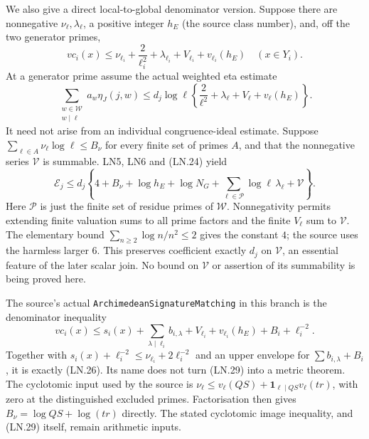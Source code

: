 We also give a direct local-to-global denominator version.  Suppose
there are nonnegative $\nu_\ell,\lambda_\ell$, a positive integer
$h_E$ (the source class number), and, off the two generator primes,
\[
 v\!c_i(x)\le\nu_{\ell_i}+\frac2{\ell_i^2}
                  +\lambda_{\ell_i}+V_{\ell_i}+v_{\ell_i}(h_E)
                       \quad(x\in Y_i).                \tag{LN.26}
\]
At a generator prime assume the actual weighted eta estimate
\[
 \sum_{\substack{w\in\mathcal W\\w\mid\ell}}a_w\eta_J(j,w)
 \le d_j\log\ell\left\{\frac2{\ell^2}+\lambda_\ell
                          +V_\ell+v_\ell(h_E)\right\}.
 \tag{LN.27}
\]
It need not arise from an individual congruence-ideal estimate.
Suppose $\sum_{\ell\in A}\nu_\ell\log\ell\le B_\nu$ for every
finite set of primes $A$, and that the nonnegative series
$\mathcal V$ is summable.  LN5, LN6 and (LN.24) yield
\[
 \boxed{\quad\mathcal E_j\le d_j\left\{
      4+B_\nu+\log h_E+\log N_G+
      \sum_{\ell\in\mathcal P}\log\ell\,\lambda_\ell
                       +\mathcal V\right\}.\quad}     \tag{LN.28}
\]
Here $\mathcal P$ is just the finite set of residue primes of
$\mathcal W$.  Nonnegativity permits extending finite valuation
sums to all prime factors and the finite $V_\ell$ sum to
$\mathcal V$.  The elementary bound
$\sum_{n\ge2}\log n/n^2\le2$ gives the constant $4$; the source
uses the harmless larger $6$.  This preserves coefficient exactly
$d_j$ on $\mathcal V$, an essential feature of the later scalar
join.  No bound on $\mathcal V$ or assertion of its summability is
being proved here.

The source's actual \texttt{ArchimedeanSignatureMatching} in this
branch is the denominator inequality
\[
 v\!c_i(x)\le s_i(x)+\sum_{\lambda\mid\ell_i}b_{i,\lambda}
                 +V_{\ell_i}+v_{\ell_i}(h_E)+B_i+\ell_i^{-2}.
 \tag{LN.29}
\]
Together with $s_i(x)+\ell_i^{-2}\le\nu_{\ell_i}+2\ell_i^{-2}$
and an upper envelope for $\sum b_{i,\lambda}+B_i$, it is exactly
(LN.26).  Its name does not turn (LN.29) into a metric theorem.
The cyclotomic input used by the source is
$\nu_\ell\le v_\ell(QS)+\mathbf1_{\ell\mid QS}v_\ell(tr)$,
with zero at the distinguished excluded primes.  Factorisation then
gives $B_\nu=\log QS+\log(tr)$ directly.  The stated cyclotomic
image inequality, and (LN.29) itself, remain arithmetic inputs.
